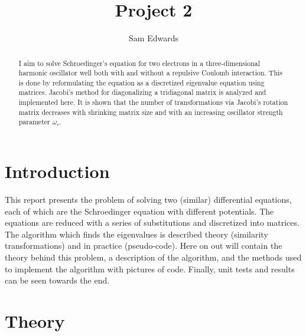 \documentclass[10pt,showpacs,preprintnumbers,footinbib,amsmath,amssymb,aps,prl,twocolumn,groupedaddress,superscriptaddress,showkeys]{revtex4-1}
\begin{document}
\title{Project 2}
\author{Sam Edwards}
\begin{abstract}
I aim to solve Schroedinger's equation for two electrons in a three-dimensional harmonic oscillator well both with and without a repulsive Coulomb interaction. This is done by reformulating the equation as a discretized eigenvalue equation using matrices. Jacobi's method for diagonalizing a tridiagonal matrix is analyzed and implemented here. It is shown that the number of transformations via Jacobi's rotation matrix decreases with shrinking matrix size and with an increasing oscillator strength parameter $\omega_{r}$. 
\end{abstract}
\maketitle

\section{Introduction}
This report presents the problem of solving two (similar) differential equations, each of which are the Schroedinger equation with different potentials. The equations are reduced with a series of substitutions and discretized into matrices. The algorithm which finds the eigenvalues is described theory (similarity transformations) and in practice (pseudo-code). Here on out will contain the theory behind this problem, a description of the algorithm, and the methods used to implement the algorithm with pictures of code. Finally, unit tests and results can be seen towards the end.

\section{Theory}
\end{document}
